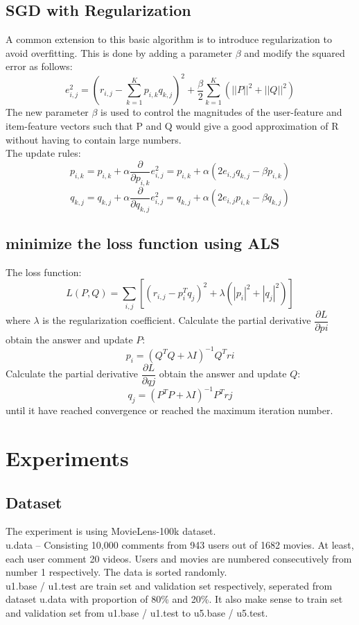 \documentclass[journal, a4paper]{IEEEtran}
\begin{document}
\subsection{SGD with Regularization}
A common extension to this basic algorithm is to introduce regularization to avoid overfitting. This is done by adding a parameter $\beta$ and modify the squared error as follows:
\begin{equation}
e_{i,j}^2 = (r_{i,j} - \sum_{k=1}^K{p_{i,k}q_{k,j}})^2 + \frac{\beta}{2} \sum_{k=1}^K{(||P||^2 + ||Q||^2)}
\end{equation}
The new parameter $\beta$ is used to control the magnitudes of the user-feature and item-feature vectors such that P and Q would give a good approximation of R without having to contain large numbers. \\
The update rules:
\begin{equation}
p_{i,k} = p_{i,k} + \alpha \frac{\partial}{\partial p_{i,k}}e_{i,j}^2 = p_{i,k} + \alpha(2 e_{i,j} q_{k,j} - \beta p_{i,k} )
\end{equation}
\begin{equation}
q_{k,j} = q_{k,j} + \alpha \frac{\partial}{\partial q_{k,j}}e_{i,j}^2 = q_{k,j} + \alpha(2 e_{i,j} p_{i,k} - \beta q_{k,j} )
\end{equation}
\subsection{minimize the loss function using ALS}
The loss function:
\begin{equation}
L(P,Q)=\sum_{i,j}[(r_{i,j}-p_{i}^{T}q_{j})^{2}+\lambda(|p_{i}|^{2}+|q_{j}|^{2})]
\end{equation}
where $\lambda$ is the regularization coefficient.
Calculate the partial derivative $\dfrac{\partial L}{\partial pi}$
obtain the answer and update $P$:
\begin{equation}
p_{i}=(Q^{T}Q+\lambda I)^{-1}Q^{T}ri
\end{equation}
Calculate the partial derivative $\dfrac{\partial L}{\partial qj}$
obtain the answer and update $Q$:
\begin{equation}
q_{j}=(P^{T}P+\lambda I)^{-1}P^{T}rj
\end{equation}
until it have reached convergence or reached the maximum iteration number.
\section{Experiments}
\subsection{Dataset}
The experiment is using MovieLens-100k dataset.\\u.data -- Consisting 10,000 comments from 943 users out of 1682 movies. At least, each user comment 20 videos. Users and movies are numbered consecutively from number 1 respectively. The data is sorted randomly.\\
u1.base / u1.test are train set and validation set respectively, seperated from dataset u.data with proportion of 80\% and 20\%. It also make sense to train set and  validation set from u1.base / u1.test to u5.base / u5.test. 
\end{document}

